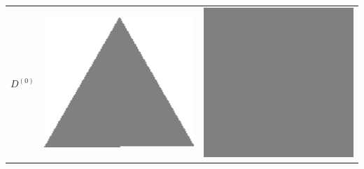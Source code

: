 \begin{frame}
\begin{center}
\begin{tabular}{ccc}
\multirow{4}{*}{$D^{(0)}$} & 
\includegraphics[scale=0.015]{figures/combinatorial-elastica/shapes/triangle.png}&
\includegraphics[scale=0.015]{figures/combinatorial-elastica/shapes/square.png}\\

\end{tabular}
\end{center}
\end{frame}
